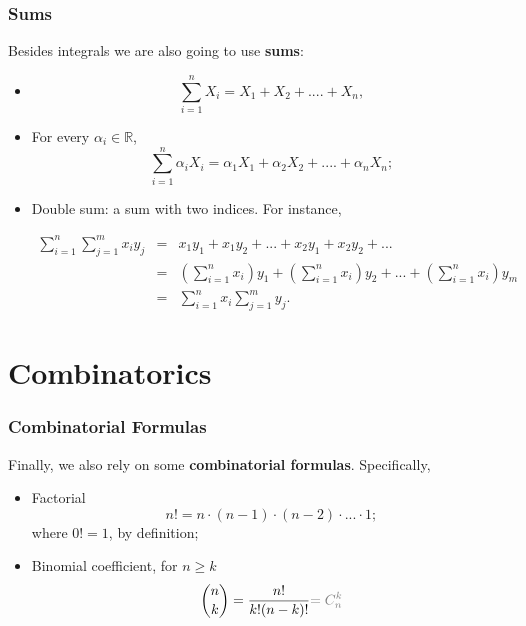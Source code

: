 \documentclass[notes=show,handout]{beamer}\usepackage[]{graphicx}\usepackage[]{color}
\newcommand{\bea}{\begin{eqnarray}}
\newcommand{\eea}{\end{eqnarray}}
\begin{document}
\begin{frame}
\frametitle{Sums}

Besides integrals we are also going to use \textbf{sums}:

\begin{itemize}
\item $$\sum_{i=1}^{n} X_{i} = X_1 + X_2 +....+ X_n,$$
\item For every $\alpha_i \in \mathbb{R}$,  $$\sum_{i=1}^{n} \alpha_i X_{i} = \alpha_1 X_1 + \alpha_2 X_2 +....+ \alpha_n X_n;$$
\item Double sum: a sum with two indices. For instance,
\begin{small}
\bea
\sum_{i=1}^{n} \sum_{j=1}^{m}  x_{i}y_{j}  &=& x_1y_1 + x_1 y_2 +... +x_2y_1+ x_2y_2 +... \nonumber \\
&=& \left(\sum_{i=1}^{n} x_i\right) y_1 +  \left(\sum_{i=1}^{n} x_i\right) y_2 + ... +  \left(\sum_{i=1}^{n} x_i\right) y_m  \nonumber \\
&=& \sum_{i=1}^{n} x_i \sum_{j=1}^{m} y_j. \nonumber
\eea
\end{small}
\end{itemize}
\end{frame}




\section{Combinatorics}


\begin{frame}
\frametitle{Combinatorial Formulas}

Finally, we also rely on some \textbf{combinatorial formulas}. Specifically,

\begin{itemize}
\item Factorial
$$
n! = n \cdot (n-1) \cdot (n-2) \cdot ... \cdot 1;
$$
where $0! =1$, by definition;
\item Binomial coefficient, for $n \geq k$
$$
\binom n k =\frac{n!}{k!(n-k)!} \color{gray}{=C^{k}_n}\color{black}
$$
\end{itemize}

\end{frame}
\end{document}
